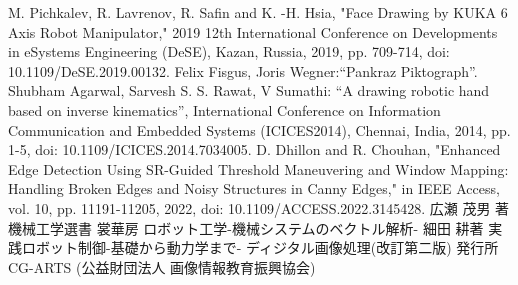 \newlength{\oldbaselineskip}
\begin{thebibliography}{99}
	M. Pichkalev, R. Lavrenov, R. Safin and K. -H. Hsia, "Face Drawing by KUKA 6 Axis Robot Manipulator," 2019 12th International Conference on Developments in eSystems Engineering (DeSE), Kazan, Russia, 2019, pp. 709-714, doi: 10.1109/DeSE.2019.00132.
	 Felix Fisgus, Joris Wegner:``Pankraz Piktograph''.
	 Shubham Agarwal, Sarvesh S. S. Rawat, V Sumathi: ``A drawing robotic hand based on inverse kinematics'', International Conference on Information Communication and Embedded Systems (ICICES2014), Chennai, India, 2014, pp. 1-5, doi: 10.1109/ICICES.2014.7034005.
	D. Dhillon and R. Chouhan, "Enhanced Edge Detection Using SR-Guided Threshold Maneuvering and Window Mapping: Handling Broken Edges and Noisy Structures in Canny Edges," in IEEE Access, vol. 10, pp. 11191-11205, 2022, doi: 10.1109/ACCESS.2022.3145428.
	広瀬 茂男 著 機械工学選書 裳華房 ロボット工学-機械システムのベクトル解析-
	細田 耕著 実践ロボット制御-基礎から動力学まで-
	ディジタル画像処理(改訂第二版) 発行所 CG-ARTS (公益財団法人 画像情報教育振興協会)
\end{thebibliography}
